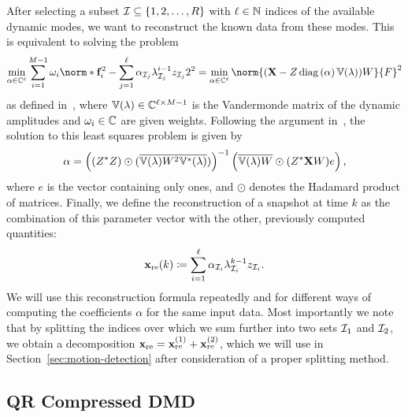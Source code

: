 After selecting a subset $\mathcal{I} \subseteq \left\{1, 2, \dots, R\right\}$ with $\ell \in \mathbb{N}$ indices of the available dynamic modes, we want to reconstruct the known data from these modes. This is equivalent to solving the problem
\begin{equation*}
    \min\limits_{\alpha \in \bb{C}^\ell} \sum\limits_{i = 1}^{M - 1} \omega_i \norm*{\bl{f}_i^2 - \sum\limits_{j = 1}^\ell \alpha_{\cl{I}_j} \lambda_{\cl{I}_j}^{i - 1} z_{\cl{I}_j}}{2}^2 = \min\limits_{\alpha \in \bb{C}^\ell} \norm{(\bl{X} - Z \diag{\alpha} \bb{V}(\lambda)) W}{F}^2
\end{equation*}
as defined in~\cite[Equation~(3.1)]{Drmac2020VandermondeKhatriRao}, where $\mathbb{V}(\lambda) \in \mathbb{C}^{\ell \times M - 1}$ is the Vandermonde matrix of the dynamic amplitudes and $\omega_i \in \mathbb{C}$ are given weights. Following the argument in~\cite{Drmac2020VandermondeKhatriRao}, the solution to this least squares problem is given by
\begin{equation}\label{eq:coefficients}
    \alpha = {\left( (Z^* Z) \odot (\overline{\mathbb{V}(\lambda) W^2 \mathbb{V}^*(\lambda)}) \right)}^{-1} \left( \overline{\mathbb{V}(\lambda) W} \odot (Z^* \mathbf{X} W) e \right),
\end{equation}
where $e$ is the vector containing only ones, and $\odot$ denotes the Hadamard product of matrices. Finally, we define the reconstruction of a snapshot at time $k$ as the combination of this parameter vector with the other, previously computed quantities:
\begin{equation}\label{eq:reconstruction}
    \mathbf{x}_\text{re}(k) \coloneqq \sum\limits_{i = 1}^\ell \alpha_{\mathcal{I}_i} \lambda_{\mathcal{I}_i}^{k - 1} z_{\mathcal{I}_i}.
\end{equation}
We will use this reconstruction formula repeatedly and for different ways of computing the coefficients $\alpha$ for the same input data. Most importantly we note that by splitting the indices over which we sum further into two sets $\mathcal{I}_1$ and $\mathcal{I}_2$, we obtain a decomposition $\mathbf{x}_\text{re} = \mathbf{x}_\text{re}^{(1)} + \mathbf{x}_\text{re}^{(2)}$, which we will use in Section~\ref{sec:motion-detection} after consideration of a proper splitting method.

\subsection{QR Compressed DMD}\label{subsec:qr-compression} %

